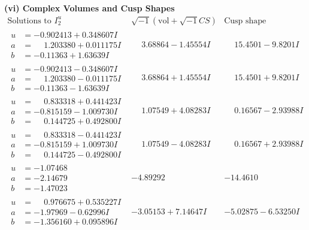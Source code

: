\documentclass[1p]{elsarticle_modified}
\theoremstyle{definition}
\newcommand{\I}{\sqrt{-1}}
\begin{document}
\newpage\flushleft \textbf{(vi) Complex Volumes and Cusp Shapes}
$$\begin{array}{c|c|c}  
\text{Solutions to }I^u_{2}& \I (\text{vol} + \sqrt{-1}CS) & \text{Cusp shape}\\
 \hline 
\begin{aligned}
u &= -0.902413 + 0.348607 I \\
a &= \phantom{-}1.203380 + 0.011175 I \\
b &= -0.11363 + 1.63639 I\end{aligned}
 & \phantom{-}3.68864 - 1.45554 I & \phantom{-}15.4501 - 9.8201 I \\ \hline\begin{aligned}
u &= -0.902413 - 0.348607 I \\
a &= \phantom{-}1.203380 - 0.011175 I \\
b &= -0.11363 - 1.63639 I\end{aligned}
 & \phantom{-}3.68864 + 1.45554 I & \phantom{-}15.4501 + 9.8201 I \\ \hline\begin{aligned}
u &= \phantom{-}0.833318 + 0.441423 I \\
a &= -0.815159 - 1.009730 I \\
b &= \phantom{-}0.144725 + 0.492800 I\end{aligned}
 & \phantom{-}1.07549 + 4.08283 I & \phantom{-}0.16567 - 2.93988 I \\ \hline\begin{aligned}
u &= \phantom{-}0.833318 - 0.441423 I \\
a &= -0.815159 + 1.009730 I \\
b &= \phantom{-}0.144725 - 0.492800 I\end{aligned}
 & \phantom{-}1.07549 - 4.08283 I & \phantom{-}0.16567 + 2.93988 I \\ \hline\begin{aligned}
u &= -1.07468\phantom{ +0.000000I} \\
a &= -2.14679\phantom{ +0.000000I} \\
b &= -1.47023\phantom{ +0.000000I}\end{aligned}
 & -4.89292\phantom{ +0.000000I} & -14.4610\phantom{ +0.000000I} \\ \hline\begin{aligned}
u &= \phantom{-}0.976675 + 0.535227 I \\
a &= -1.97969 - 0.62996 I \\
b &= -1.356160 + 0.095896 I\end{aligned}
 & -3.05153 + 7.14647 I & -5.02875 - 6.53250 I \\ \hline\begin{aligned}

\end{aligned}
\end{array}$$
\end{document}
